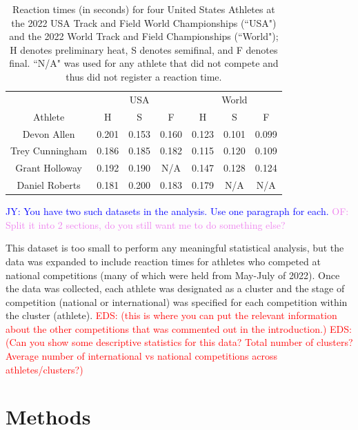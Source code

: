 \documentclass[12pt, letterpaper, titlepage]{article}
\newcommand{\jy}[1]{\textcolor{blue}{JY: #1}}
\newcommand{\eds}[1]{\textcolor{red}{EDS: (#1)}}
\newcommand{\of}[1]{\textcolor{violet}{OF: #1}}
\begin{document}
\begin{table}
\begin{center}
  \caption{Reaction times (in seconds) for four United States Athletes at the 
	2022 USA Track
  and Field World Championships (``USA") and the 2022 World Track and Field 
	Championships (``World"); H denotes preliminary heat, S denotes semifinal, and 
	F denotes final.
  ``N/A" was used for any athlete that did not compete and thus did not register 
  a reaction time. }
  \begin{tabular}{c c c c c c c} 
   \toprule
	 & \multicolumn{3}{c}{USA} & \multicolumn{3}{c}{World} \\
	\cmidrule(lr){2-4}
    \cmidrule(lr){5-7}
   Athlete &  H &  S &  F &  H &  S &  F \\ [0.5ex] 
   \midrule
   Devon Allen & 0.201 & 0.153 & 0.160 & 0.123 & 0.101 & 0.099 \\ 
   Trey Cunningham & 0.186 & 0.185 & 0.182 & 0.115 & 0.120 & 0.109 \\
   Grant Holloway & 0.192 & 0.190 & N/A & 0.147 & 0.128 & 0.124 \\
   Daniel Roberts & 0.181 & 0.200 & 0.183 & 0.179 & N/A & N/A \\ [0.5ex]
   \bottomrule
  \end{tabular}
  \label{fig:USAvsWorld}
  
  \end{center}
\end{table}

\jy{You have two such datasets in the analysis. Use one paragraph for each.}
\of{Split it into 2 sections, do you still want me to do something else?}


This dataset is too small to perform any meaningful statistical analysis, but
the data was expanded to include reaction times for athletes who competed at 
national competitions (many of which were held from May-July of 2022). Once the 
data was collected, each athlete was designated as a cluster and the stage of
competition (national or international) was specified for each competition 
within the cluster (athlete).  \eds{this is where you can put the relevant 
information about the other competitions that was commented out in the 
introduction.}
\eds{Can you show some descriptive statistics for this data?  Total number of 
clusters? Average number of international vs national competitions across 
athletes/clusters?} 


\section{Methods} \label{sec:Methods}
\end{document}
